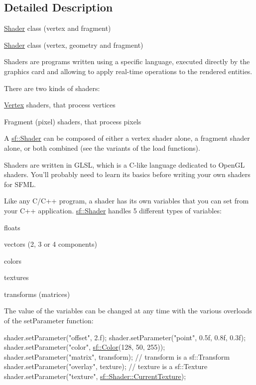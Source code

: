\subsection{Detailed Description}
\hyperlink{classsf_1_1_shader}{Shader} class (vertex and fragment) 

\hyperlink{classsf_1_1_shader}{Shader} class (vertex, geometry and fragment)

Shaders are programs written using a specific language, executed directly by the graphics card and allowing to apply real-\/time operations to the rendered entities.

There are two kinds of shaders\-: \begin{DoxyItemize}
\item \hyperlink{classsf_1_1_vertex}{Vertex} shaders, that process vertices \item Fragment (pixel) shaders, that process pixels\end{DoxyItemize}
A \hyperlink{classsf_1_1_shader}{sf\-::\-Shader} can be composed of either a vertex shader alone, a fragment shader alone, or both combined (see the variants of the load functions).

Shaders are written in G\-L\-S\-L, which is a C-\/like language dedicated to Open\-G\-L shaders. You'll probably need to learn its basics before writing your own shaders for S\-F\-M\-L.

Like any C/\-C++ program, a shader has its own variables that you can set from your C++ application. \hyperlink{classsf_1_1_shader}{sf\-::\-Shader} handles 5 different types of variables\-: \begin{DoxyItemize}
\item floats \item vectors (2, 3 or 4 components) \item colors \item textures \item transforms (matrices)\end{DoxyItemize}
The value of the variables can be changed at any time with the various overloads of the set\-Parameter function\-: 
\begin{DoxyCode}
shader.setParameter(\textcolor{stringliteral}{"offset"}, 2.f);
shader.setParameter(\textcolor{stringliteral}{"point"}, 0.5f, 0.8f, 0.3f);
shader.setParameter(\textcolor{stringliteral}{"color"}, \hyperlink{classsf_1_1_color}{sf::Color}(128, 50, 255));
shader.setParameter(\textcolor{stringliteral}{"matrix"}, transform); \textcolor{comment}{// transform is a sf::Transform}
shader.setParameter(\textcolor{stringliteral}{"overlay"}, texture); \textcolor{comment}{// texture is a sf::Texture}
shader.setParameter(\textcolor{stringliteral}{"texture"}, \hyperlink{classsf_1_1_shader_ad679e434fc4f1a1af65f3815b2310fb5}{sf::Shader::CurrentTexture});
\end{DoxyCode}


